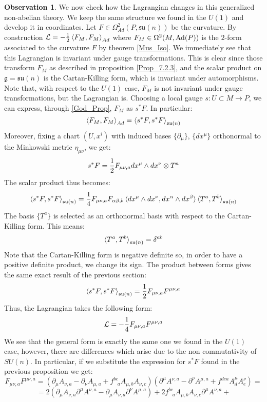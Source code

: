 \documentclass[12pt,a4paper]{report}
\theoremstyle{definition}
\theoremstyle{Theorem}
\theoremstyle{definition}
\theoremstyle{definition}
\newtheorem{Obs}[Def]{Observation}
\begin{document}
	\begin{Obs}
		We now check how the Lagrangian changes in this generalized non-abelian theory. We keep the same structure we found in the $U(1)$ and develop it in coordinates. Let $F\in\Omega^2_{Ad}(P,\mathfrak{su}(n))$ be the curvature. By construction $\mathcal{L}=-{1\over 2}\braket{F_M,F_M}_{Ad}$ where $F_M\in \Omega^2(M,\hbox{Ad}(P))$ is the $2$-form associated to the curvature $F$ by theorem \ref{Mus_Iso}. We immediately see that this Lagrangian is invariant under gauge transformations. This is clear since those transform $F_M$ as described in proposition \ref{Prop_7.2.3}, and the scalar product on $\mathfrak{g}=\mathfrak{su}(n)$ is the Cartan-Killing form, which is invariant under automorphisms.\\
		Note that, with respect to the $U(1)$ case, $F_M$ is not invariant under gauge transformations, but the Lagrangian is. Choosing a local gauge $s:U\subset M\rightarrow P$, we can express, through \ref{God_Prop}, $F_M$ as $s^*F$. In particular:
		$$\braket{F_M,F_M}_{Ad}=\braket{s^*F,s^*F}_{\mathfrak{su}(n)}$$
		Moreover, fixing a chart $(U,x^i)$ with induced bases $\{\partial_\mu\}$, $\{dx^\mu\}$ orthonormal to the Minkowski metric $\eta_{\mu\nu}$, we get:
		$$s^*F={1\over 2}F_{\mu\nu,a}dx^\mu\wedge dx^\nu\otimes T^a$$
		The scalar product thus becomes:
		$$\braket{s^*F,s^*F}_{\mathfrak{su}(n)}={1\over 4}F_{\mu\nu,a}F_{\alpha\beta,b}\braket{dx^\mu\wedge dx^\nu,dx^\alpha\wedge dx^\beta}\braket{T^a,T^b}_{\mathfrak{su}(n)}$$
		The basis $\{T^a\}$ is selected as an orthonormal basis with respect to the Cartan-Killing form. This means:
		$$\braket{T^a,T^b}_{\mathfrak{su}(n)}=\delta^{ab}$$
		Note that the Cartan-Killing form is negative definite so, in order to have a positive definite product, we change its sign. The product between forms gives the same exact result of the previous section:
		$$\braket{s^*F,s^*F}_{\mathfrak{su}(n)}={1\over 2}F_{\mu\nu,a}F^{\mu\nu,a}$$
		Thus, the Lagrangian takes the following form:
		$$\mathcal{L}=-{1\over 4}F_{\mu\nu,a}F^{\mu\nu,a}$$
		We see that the general form is exactly the same one we found in the $U(1)$ case, however, there are differences which arise due to the non commutativity of $SU(n)$. In particular, if we substitute the expression for $s^*F$ found in the previous proposition we get:
		$$F_{\mu\nu,a}F^{\mu\nu,a}=(\partial_\mu A_{\nu,a}-\partial_\nu A_{\mu,a}+f^{bc}_{\hspace{9pt}a}A_{\mu,b}A_{\nu,c})(\partial^\mu A^{\nu,a}-\partial^\nu A^{\mu,a}+f^{dea}A^{\mu}_dA^{\nu}_e)=$$
		$$=2(\partial_\mu A_{\nu,a}\partial^\mu A^{\nu,a}-\partial_\mu A_{\nu,a}\partial^\nu A^{\mu,a})+2f^{bc}_{\hspace{9pt}a}A_{\mu,b}A_{\nu,c}\partial^\mu A^{\nu,a}+$$

\end{Obs}
\end{document}
